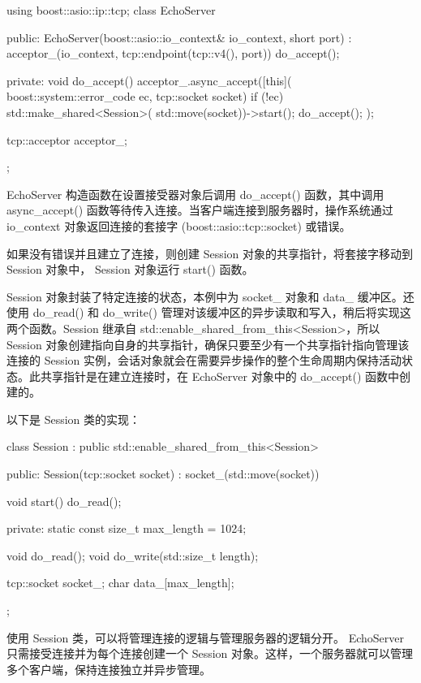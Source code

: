 \begin{cpp}
using boost::asio::ip::tcp;
class EchoServer {
public:
    EchoServer(boost::asio::io_context& io_context,
               short port)
        : acceptor_(io_context,
                    tcp::endpoint(tcp::v4(),
                    port)) {
        do_accept();
    }

private:
    void do_accept() {
        acceptor_.async_accept([this](
                    boost::system::error_code ec,
                    tcp::socket socket) {
            if (!ec) {
                std::make_shared<Session>(
                std::move(socket))->start();
            }
            do_accept();
        });
    }

    tcp::acceptor acceptor_;
};
\end{cpp}

EchoServer 构造函数在设置接受器对象后调用 do\_accept() 函数，其中调用 async\_accept() 函数等待传入连接。当客户端连接到服务器时，操作系统通过 io\_context 对象返回连接的套接字 (boost::asio::tcp::socket) 或错误。

如果没有错误并且建立了连接，则创建 Session 对象的共享指针，将套接字移动到 Session 对象中， Session 对象运行 start() 函数。

Session 对象封装了特定连接的状态，本例中为 socket\_ 对象和 data\_ 缓冲区。还使用 do\_read() 和 do\_write() 管理对该缓冲区的异步读取和写入，稍后将实现这两个函数。Session 继承自 std::enable\_shared\_from\_this<Session>，所以 Session 对象创建指向自身的共享指针，确保只要至少有一个共享指针指向管理该连接的 Session 实例，会话对象就会在需要异步操作的整个生命周期内保持活动状态。此共享指针是在建立连接时，在 EchoServer 对象中的 do\_accept() 函数中创建的。

以下是 Session 类的实现：

\begin{cpp}
class Session
    : public std::enable_shared_from_this<Session>
{
public:
    Session(tcp::socket socket)
        : socket_(std::move(socket)) {}

    void start() { do_read(); }

private:
    static const size_t max_length = 1024;

    void do_read();
    void do_write(std::size_t length);

    tcp::socket socket_;
    char data_[max_length];
};
\end{cpp}

使用 Session 类，可以将管理连接的逻辑与管理服务器的逻辑分开。 EchoServer 只需接受连接并为每个连接创建一个 Session 对象。这样，一个服务器就可以管理多个客户端，保持连接独立并异步管理。


